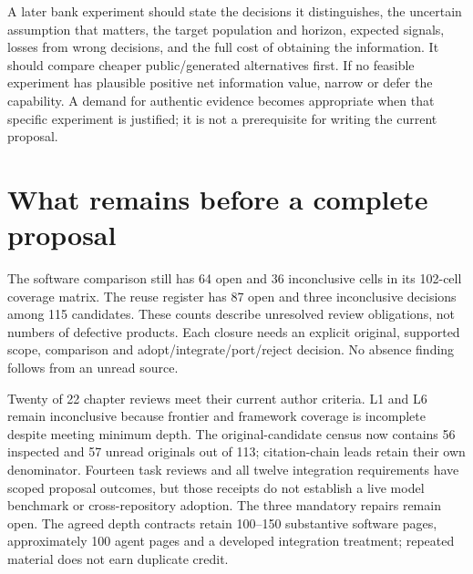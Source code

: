 A later bank experiment should state the decisions it distinguishes, the
uncertain assumption that matters, the target population and horizon,
expected signals, losses from wrong decisions, and the full cost of
obtaining the information. It should compare cheaper public/generated
alternatives first. If no feasible experiment has plausible positive net
information value, narrow or defer the capability. A demand for
authentic evidence becomes appropriate when that specific experiment is
justified; it is not a prerequisite for writing the current proposal.

\hypertarget{what-remains-before-a-complete-proposal}{%
\section{What remains before a complete
proposal}\label{what-remains-before-a-complete-proposal}}

The software comparison still has 64 open and 36 inconclusive cells in
its 102-cell coverage matrix. The reuse register has 87 open and three
inconclusive decisions among 115 candidates. These counts describe
unresolved review obligations, not numbers of defective products. Each
closure needs an explicit original, supported scope, comparison and
adopt/integrate/port/reject decision. No absence finding follows from an
unread source.
\citep{sp21gs_progress,sp21eo_progress,sp21tr_progress,sp21ae_progress,sp21gr_progress,sp21ck_progress,sp21cx_progress,sp20md_progress,sp20gf_progress,sp20hy_progress,sp20je_progress,sp20nc_progress,sp20gc_progress,sp20ea_progress,sp20vm_progress,sp20pye_progress,sp20fx_progress,sp20pa_progress,sp20rfx_progress}

Twenty of 22 chapter reviews meet their current author criteria. L1 and
L6 remain inconclusive because frontier and framework coverage is
incomplete despite meeting minimum depth. The original-candidate census
now contains 56 inspected and 57 unread originals out of 113;
citation-chain leads retain their own denominator. Fourteen task reviews
and all twelve integration requirements have scoped proposal outcomes,
but those receipts do not establish a live model benchmark or
cross-repository adoption. The three mandatory repairs remain open. The
agreed depth contracts retain 100--150 substantive software pages,
approximately 100 agent pages and a developed integration treatment;
repeated material does not earn duplicate credit.
\citep{sp21gs_progress,sp19ec_census,sp18ar_census,sp18f_census,sp13_scope}

